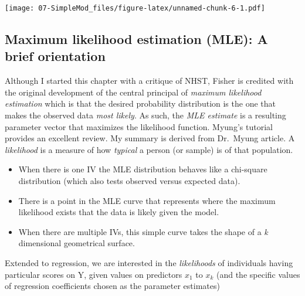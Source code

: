 \documentclass[
  11pt,
]{book}
\providecommand{\tightlist}{%
  \setlength{\itemsep}{0pt}\setlength{\parskip}{0pt}}
\begin{document}
\texttt{[image: 07-SimpleMod\_files/figure-latex/unnamed-chunk-6-1.pdf]}

\hypertarget{maximum-likelihood-estimation-mle-a-brief-orientation}{%
\subsection{Maximum likelihood estimation (MLE): A brief orientation}\label{maximum-likelihood-estimation-mle-a-brief-orientation}}

Although I started this chapter with a critique of NHST, Fisher is credited \citep{myung_tutorial_2003} with the original development of the central principal of \emph{maximum likelihood estimation} which is that the desired probability distribution is the one that makes the observed data \emph{most likely}. As such, the \emph{MLE estimate} is a resulting parameter vector that maximizes the likelihood function. Myung's \citeyearpar{myung_tutorial_2003} tutorial provides an excellent review. My summary is derived from Dr.~Myung article. A \emph{likelihood} is a measure of how \emph{typical} a person (or sample) is of that population.

\begin{itemize}
\tightlist
\item
  When there is one IV the MLE distribution behaves like a chi-square distribution (which also tests observed versus expected data).
\item
  There is a point in the MLE curve that represents where the maximum likelihood exists that the data is likely given the model.
\item
  When there are multiple IVs, this simple curve takes the shape of a \emph{k} dimensional geometrical surface.
\end{itemize}

Extended to regression, we are interested in the \emph{likelihoods} of individuals having particular scores on Y, given values on predictors \(x_{1}\) to \(x_{k}\) (and the specific values of regression coefficients chosen as the parameter estimates)
\end{document}
